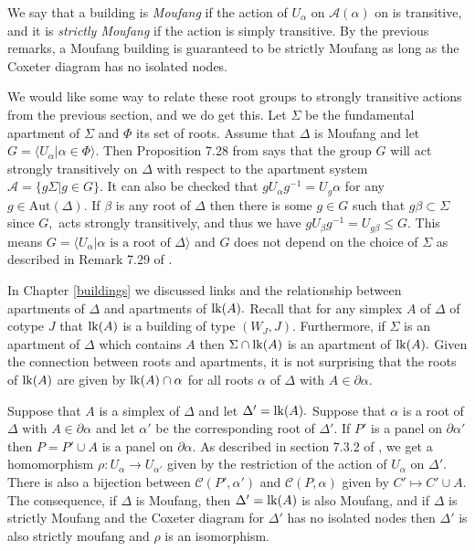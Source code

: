 \documentclass[class=book, crop=false,12 pt]{standalone}
\begin{document}
We say that a building is \emph{Moufang} if the action of $U_\alpha$ on $\mathcal{A}(\alpha)$ on is transitive, and it is \emph{strictly Moufang} if the action is simply transitive. By the previous remarks, a Moufang building is guaranteed to be strictly Moufang as long as the Coxeter diagram has no isolated nodes. 

We would like some way to relate these root groups to strongly transitive actions from the previous section, and we do get this. Let $\Sigma$ be the fundamental apartment of $\Sigma$ and $\Phi$ its set of roots. Assume that $\Delta$ is Moufang and let $G=\langle U_\alpha|\alpha\in \Phi\rangle.$ Then Proposition 7.28 from \cite{buildings} says that the group $G$ will act strongly transitively on $\Delta$ with respect to the apartment system $\mathcal{A}=\{g\Sigma|g\in G\}.$ It can also be checked that $gU_\alpha g^{-1}=U_g\alpha$ for any $g\in \mathrm{Aut}(\Delta).$ If $\beta$ is any root of $\Delta$ then there is some $g\in G$ such that $g\beta\subset \Sigma$ since $G,$ acts strongly transitively, and thus we have $gU_\beta g^{-1}=U_{g\beta}\le G.$ This means $G=\langle U_{\alpha}|\alpha \text{ is a root of }\Delta\rangle$ and $G$ does not depend on the choice of $\Sigma$ as described in Remark 7.29 of \cite{buildings}.

In Chapter \ref{buildings} we discussed links and the relationship between apartments of $\Delta$ and apartments of $\mathrm{lk}(A).$ Recall that for any simplex $A$ of $\Delta$ of cotype $J$ that $\mathrm{lk}(A)$ is a building of type $(W_J,J).$ Furthermore, if $\Sigma$ is an apartment of $\Delta$ which contains $A$ then $\Sigma\cap \mathrm{lk}(A)$ is an apartment of $\mathrm{lk}(A).$ Given the connection between roots and apartments, it is not surprising that the roots of $\mathrm{lk}(A)$ are given by $\mathrm{lk}(A)\cap \alpha$ for all roots $\alpha$ of $\Delta$ with $A\in \partial \alpha.$

Suppose that $A$ is a simplex of $\Delta$ and let $\Delta'=\mathrm{lk}(A).$ Suppose that $\alpha$ is a root of $\Delta$ with $A\in \partial \alpha$ and let $\alpha'$ be the corresponding root of $\Delta'.$ If $P'$ is a panel on $\partial \alpha'$ then $P=P'\cup A$ is a panel on $\partial \alpha.$ As described in section 7.3.2 of \cite{buildings}, we get a homomorphism $\rho:U_\alpha \to U_{\alpha'}$ given by the restriction of the action of $U_{\alpha}$ on $\Delta'.$ There is also a bijection between $\mathcal{C}(P',\alpha')$ and $\mathcal{C}(P,\alpha)$ given by $C'\mapsto C'\cup A.$ The consequence, if $\Delta$ is Moufang, then $\Delta'=\mathrm{lk}(A)$ is also Moufang, and if $\Delta$ is strictly Moufang and the Coxeter diagram for $\Delta'$ has no isolated nodes then $\Delta'$ is also strictly moufang and $\rho$ is an isomorphism. 
\end{document}
